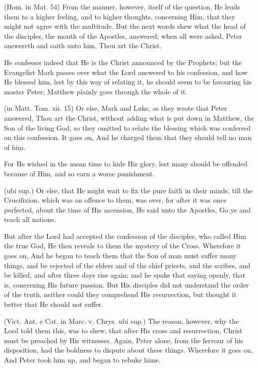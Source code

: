  (Hom. in Mat. 54) From the manner, however, itself of the question, He leads them to a higher feeling, and to higher thoughts, concerning Him, that they might not agree with the multitude. But the next words shew what the head of the disciples, the mouth of the Apostles, answered; when all were asked, Peter answereth and saith unto him, Thou art the Christ.

 He confesses indeed that He is the Christ announced by the Prophets; but the Evangelist Mark passes over what the Lord answered to his confession, and how He blessed him, lest by this way of relating it, he should seem to be favouring his master Peter; Matthew plainly goes through the whole of it.

 (in Matt. Tom. xii. 15) Or else, Mark and Luke, as they wrote that Peter answered, Thou art the Christ, without adding what is put down in Matthew, the Son of the living God, so they omitted to relate the blessing which was conferred on this confession. It goes on, And he charged them that they should tell no man of him.

 For He wished in the mean time to hide His glory, lest many should be offended because of Him, and so earn a worse punishment.

 (ubi sup.) Or else, that He might wait to fix the pure faith in their minds, till the Crucifixion, which was an offence to them, was over, for after it was once perfected, about the time of His ascension, He said unto the Apostles, Go ye and teach all nations.

 But after the Lord had accepted the confession of the disciples, who called Him the true God, He then reveals to them the mystery of the Cross. Wherefore it goes on, And he began to teach them that the Son of man must suffer many things, and be rejected of the elders and of the chief priests, and the scribes, and be killed, and after three days rise again; and he spake that saying openly, that is, concerning His future passion. But His disciples did not understand the order of the truth, neither could they comprehend His resurrection, but thought it better that He should not suffer.

 (Vict. Ant. e Cat. in Marc. v. Chrys. ubi sup.) The reason, however, why the Lord told them this, was to shew, that after His cross and resurrection, Christ must be preached by His witnesses. Again, Peter alone, from the fervour of his disposition, had the boldness to dispute about these things. Wherefore it goes on, And Peter took him up, and began to rebuke hime.

